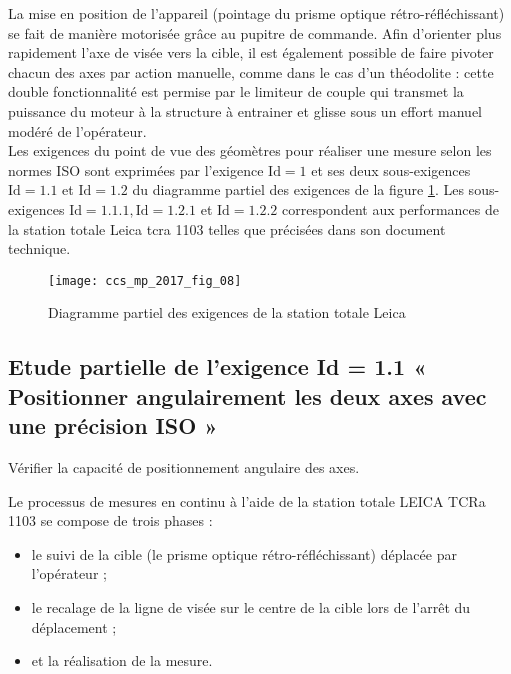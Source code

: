 La mise en position de l'appareil (pointage du prisme optique rétro-réfléchissant) se fait de manière motorisée grâce au pupitre de commande. Afin d'orienter plus rapidement l'axe de visée vers la cible, il est également possible de faire pivoter chacun des axes par action manuelle, comme dans le cas d'un théodolite : cette double fonctionnalité est permise par le limiteur de couple qui transmet la puissance du moteur à la structure à entrainer et glisse sous un effort manuel modéré de l'opérateur.\\
Les exigences du point de vue des géomètres pour réaliser une mesure selon les normes ISO sont exprimées par l'exigence $\mathrm{Id}=  1  $ et ses deux sous-exigences $\mathrm{Id}=  1.1  $ et $\mathrm{Id}=  1.2  $ du diagramme partiel des exigences de la figure \ref{CCS_MP_2017:fig_08}. Les sous-exigences $\mathrm{Id}=  1.1 .1  , \mathrm{Id}=  1.2 .1  $ et $\mathrm{Id}=  1.2 .2  $ correspondent aux performances de la station totale Leica tcra 1103 telles que précisées dans son document technique.



\begin{figure}[!h]
\centering
\texttt{[image: ccs\_mp\_2017\_fig\_08]}

\caption{Diagramme partiel des exigences de la station totale Leica\label{CCS_MP_2017:fig_08}}
\end{figure}

\subsection{Etude partielle de l’exigence Id =  1.1  « Positionner angulairement les deux axes avec
une précision ISO »}

\begin{obj}
Vérifier la capacité de positionnement angulaire des axes.
\end{obj}

Le processus de mesures en continu à l'aide de la station totale LEICA TCRa 1103 se compose de trois phases :

\begin{itemize}
  \item le suivi de la cible (le prisme optique rétro-réfléchissant) déplacée par l'opérateur ;
  \item le recalage de la ligne de visée sur le centre de la cible lors de l'arrêt du déplacement ;
  \item et la réalisation de la mesure.
\end{itemize}

